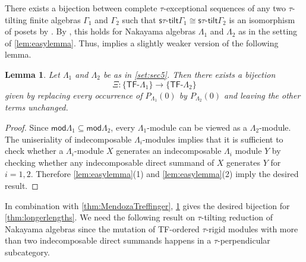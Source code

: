 \documentclass[11pt]{amsart}
\newcommand{\stt}{\mathsf{s}\tau\text{-}\mathsf{tilt}}
\newcommand{\mods}{\mathsf{mod}}
\newcommand{\tfo}[1]{\ensuremath{\mathsf{TF}\text{-} #1}}
\newtheorem{lemma}[theorem]{Lemma}
\theoremstyle{definition}
\begin{document}
There exists a bijection between complete $\tau$-exceptional sequences of any two $\tau$-tilting finite algebras $\Gamma_1$ and $\Gamma_2$ such that $\stt \Gamma_1  \cong \stt \Gamma_2$ is an isomorphism of posets by \cite[Thm. D]{BarnardHanson2022exc}. By \cite[Thm. 3.11]{Adachi2016}, this holds for Nakayama algebras $\Lambda_1$ and $\Lambda_2$ as in the setting of \cref{lem:easylemma}. Thus, \cite[Thm. 5.1]{mendozatreffinger_stratifyingsystems} implies a slightly weaker version of the following lemma. 
\begin{lemma}\label{lem:bijTFtt}
    Let $\Lambda_1$ and $\Lambda_2$ be as in \cref{set:sec5}. Then there exists a bijection 
    \[ \Xi: \{ \tfo{\Lambda_1} \} \to \{ \tfo{\Lambda_2} \} \]
    given by replacing every occurrence of $P_{\Lambda_1}(0)$ by $P_{\Lambda_2}(0)$ and leaving the other terms unchanged.
\end{lemma}
\begin{proof}
    Since $\mods \Lambda_1 \subseteq \mods \Lambda_2$, every $\Lambda_1$-module can be viewed as a $\Lambda_2$-module. The uniseriality of indecomposable $\Lambda_i$-modules implies that it is sufficient to check whether a $\Lambda_i$-module $X$ generates an indecomposable $\Lambda_i$ module $Y$ by checking whether any indecomposable direct summand of $X$ generates $Y$ for $i=1,2$. Therefore \cref{lem:easylemma}(1) and \cref{lem:easylemma}(2) imply the desired result. 
\end{proof}


In combination with \cref{thm:MendozaTreffinger}, \cref{lem:bijTFtt} gives the desired bijection for \cref{thm:longerlengths}. We need the following result on $\tau$-tilting reduction of Nakayama algebras since the mutation of TF-ordered $\tau$-rigid modules with more than two indecomposable direct summands happens in a $\tau$-perpendicular subcategory.
\end{document}
